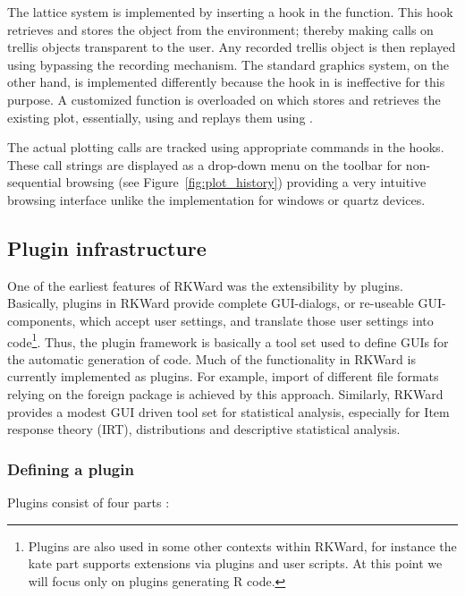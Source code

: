 The lattice system is implemented by inserting a hook in the 
function. This hook retrieves and stores the  object from the
 environment; thereby making  calls on trellis
objects transparent to the user. Any recorded trellis object is then replayed
using  bypassing the recording mechanism. The standard graphics
system, on the other hand, is implemented differently because the hook in
 is ineffective for this purpose. A customized function is overloaded
on  which stores and retrieves the existing plot, essentially, using
 and replays them using .

The actual plotting calls are tracked using appropriate  commands in
the hooks. These call strings are displayed as a drop-down menu on the toolbar
for non-sequential browsing (see Figure~\ref{fig:plot_history}) providing a very intuitive browsing
interface unlike the implementation for windows or quartz devices.

\subsection[technical_plugins]{Plugin infrastructure}
One of the earliest features of RKWard was the extensibility by plugins.
Basically, plugins in RKWard provide complete GUI-dialogs, or re-useable
GUI-components, which accept user settings, and translate those user settings
into  code\footnote{
    Plugins are also used in some other contexts within RKWard, for instance the
    kate part supports extensions via plugins and user scripts. At this point we
    will focus only on plugins generating R code.
}. Thus, the plugin framework is basically a tool set used to define
GUIs for the automatic generation of  code. Much of the functionality in RKWard
is currently implemented as plugins. For example, import of different file
formats relying on the foreign package is achieved by this approach. Similarly,
RKWard provides a modest GUI driven tool set for statistical analysis,
especially for Item response theory (IRT), distributions and descriptive
statistical analysis. 

\subsubsection[technical_plugins_defining]{Defining a plugin}
Plugins consist of four parts \citep[see Section~\ref{example_plugin} for an example; for a complete
manual, see][]{Friedrichsmeier2010}:

